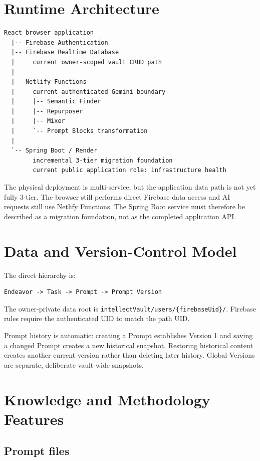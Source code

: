 \documentclass[11pt]{article}
\newcommand{\code}[1]{\texttt{#1}}
\begin{document}
\section{Runtime Architecture}

\begin{verbatim}
React browser application
  |-- Firebase Authentication
  |-- Firebase Realtime Database
  |     current owner-scoped vault CRUD path
  |
  |-- Netlify Functions
  |     current authenticated Gemini boundary
  |     |-- Semantic Finder
  |     |-- Repurposer
  |     |-- Mixer
  |     `-- Prompt Blocks transformation
  |
  `-- Spring Boot / Render
        incremental 3-tier migration foundation
        current public application role: infrastructure health
\end{verbatim}

The physical deployment is multi-service, but the application data path is not
yet fully 3-tier. The browser still performs direct Firebase data access and AI
requests still use Netlify Functions. The Spring Boot service must therefore be
described as a migration foundation, not as the completed application API.

\section{Data and Version-Control Model}

The direct hierarchy is:

\begin{verbatim}
Endeavor -> Task -> Prompt -> Prompt Version
\end{verbatim}

The owner-private data root is
\code{intellectVault/users/\{firebaseUid\}/}. Firebase rules require the
authenticated UID to match the path UID.

Prompt history is automatic: creating a Prompt establishes Version 1 and saving
a changed Prompt creates a new historical snapshot. Restoring historical content
creates another current version rather than deleting later history. Global
Versions are separate, deliberate vault-wide snapshots.

\section{Knowledge and Methodology Features}

\subsection{Prompt files}
\end{document}
